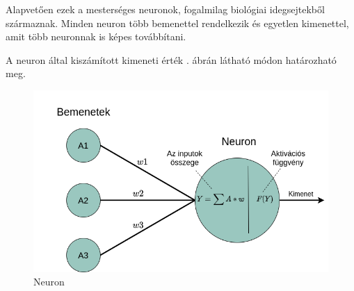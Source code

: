 Alapvetően ezek a mesterséges neuronok, fogalmilag biológiai idegsejtekből származnak.
Minden neuron több bemenettel rendelkezik és egyetlen kimenettel, amit több neuronnak is képes továbbítani.

\noindent A neuron által kiszámított kimeneti érték . ábrán látható módon határozható meg.

\begin{figure}[h!]
\centering
\includegraphics[scale=0.5]{images/neuron.png}
\caption{Neuron}
\label{fig:neuron}
\end{figure}

